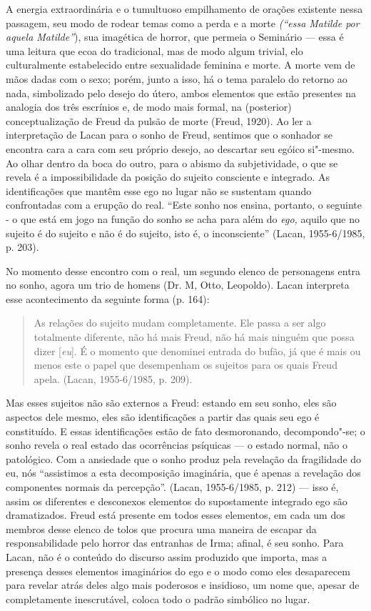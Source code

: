 A energia extraordinária e o tumultuoso empilhamento de orações
existente nessa passagem, seu modo de rodear temas como a perda e a
morte \emph{(``essa Matilde por aquela Matilde''}), sua imagética de
horror, que permeia o Seminário --- essa é uma leitura que ecoa do
tradicional, mas de modo algum trivial, elo culturalmente estabelecido
entre sexualidade feminina e morte. A morte vem de mãos dadas com o
sexo; porém, junto a isso, há o tema paralelo do retorno ao nada,
simbolizado pelo desejo do útero, ambos elementos que estão presentes na
analogia dos três escrínios e, de modo mais formal, na (posterior)
conceptualização de Freud da pulsão de morte (Freud, 1920). Ao ler a
interpretação de Lacan para o sonho de Freud, sentimos que o sonhador se
encontra cara a cara com seu próprio desejo, ao descartar seu egóico
si"-mesmo. Ao olhar dentro da boca do outro, para o abismo da
subjetividade, o que se revela é a impossibilidade da posição do sujeito
consciente e integrado. As identificações que mantêm esse ego no lugar
não se sustentam quando confrontadas com a erupção do real. ``Este sonho
nos ensina, portanto, o seguinte - o que está em jogo na função do sonho
se acha para além do \emph{ego,} aquilo que no sujeito é do sujeito e
não é do sujeito, isto é, o inconsciente'' (Lacan, 1955-6/1985, p. 203).

No momento desse encontro com o real, um segundo elenco de personagens
entra no sonho, agora um trio de homens (Dr. M, Otto, Leopoldo). Lacan
interpreta esse acontecimento da seguinte forma (p. 164):

\begin{quote}
As relações do sujeito mudam completamente. Ele passa a ser algo
totalmente diferente, não há mais Freud, não há mais ninguém que possa
dizer {[}\emph{eu}{]}. É o momento que denominei entrada do bufão, já
que é mais ou menos este o papel que desempenham os sujeitos para os
quais Freud apela. (Lacan, 1955-6/1985, p. 209).
\end{quote}

Mas esses sujeitos não são externos a Freud: estando em seu sonho, eles
são aspectos dele mesmo, eles são identificações a partir das quais seu
ego é constituído. E essas identificações estão de fato desmoronando,
decompondo"-se; o sonho revela o real estado das ocorrências psíquicas ---
o estado normal, não o patológico. Com a ansiedade que o sonho produz
pela revelação da fragilidade do eu, nós ``assistimos a esta
decomposição imaginária, que é apenas a revelação dos componentes
normais da percepção''. (Lacan, 1955-6/1985, p. 212) --- isso é, assim os
diferentes e desconexos elementos do supostamente integrado ego são
dramatizados. Freud está presente em todos esses elementos, em cada um
dos membros desse elenco de tolos que procura uma maneira de escapar da
responsabilidade pelo horror das entranhas de Irma; afinal, é seu sonho.
Para Lacan, não é o conteúdo do discurso assim produzido que importa,
mas a presença desses elementos imaginários do ego e o modo como eles
desaparecem para revelar atrás deles algo mais poderosos e insidioso, um
nome que, apesar de completamente inescrutável, coloca todo o padrão
simbólico no lugar.

